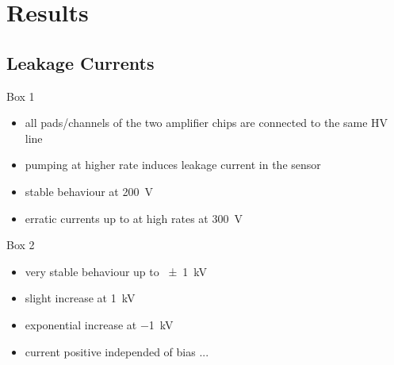 \section{Results}
\subsection{Leakage Currents}
\begin{frame}{Box 1}

	\begin{itemize}\itemfill
		\item all pads/channels of the two amplifier chips are connected to the same HV line
		\item pumping at higher rate induces leakage current in the sensor
	\end{itemize}\vspace*{-10pt}
	
	\vspace*{-10pt}
	
	\begin{itemize}
		\item<1-> stable behaviour at \SI[retain-explicit-plus]{+200}{\volt}
		\item<2> erratic currents up to  at high rates at \SI[retain-explicit-plus]{+300}{\volt}
	\end{itemize}
	
\end{frame}
\begin{frame}{Box 2}
	
	
	\begin{itemize}\itemfill
		\item<1-> very stable behaviour up to \SI{\pm1}{\kilo\volt}
		\item<1-> slight increase at \SI[retain-explicit-plus]{+1}{\kilo\volt}
		\item<2-> exponential increase at \SI{-1}{\kilo\volt}
		\item<3-> current positive independed of bias ...
	\end{itemize}
	
\end{frame}

